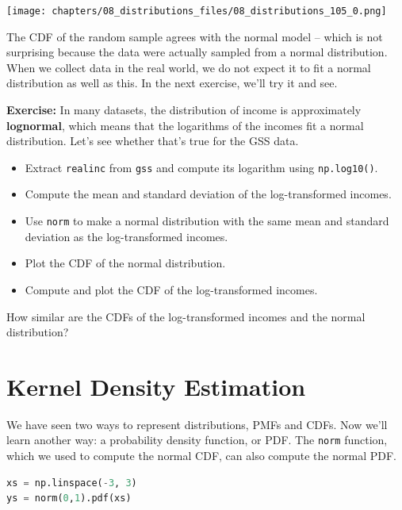 \begin{center}
\texttt{[image: chapters/08\_distributions\_files/08\_distributions\_105\_0.png]}
\end{center}

The CDF of the random sample agrees with the normal model -- which is
not surprising because the data were actually sampled from a normal
distribution. When we collect data in the real world, we do not expect
it to fit a normal distribution as well as this. In the next exercise,
we'll try it and see.

\textbf{Exercise:} In many datasets, the distribution of income is
approximately \textbf{lognormal}, which means that the logarithms of the
incomes fit a normal distribution. Let's see whether that's true for the
GSS data.

\begin{itemize}
\item
  Extract \passthrough{\lstinline!realinc!} from
  \passthrough{\lstinline!gss!} and compute its logarithm using
  \passthrough{\lstinline!np.log10()!}.
\item
  Compute the mean and standard deviation of the log-transformed
  incomes.
\item
  Use \passthrough{\lstinline!norm!} to make a normal distribution with
  the same mean and standard deviation as the log-transformed incomes.
\item
  Plot the CDF of the normal distribution.
\item
  Compute and plot the CDF of the log-transformed incomes.
\end{itemize}

How similar are the CDFs of the log-transformed incomes and the normal
distribution?

\hypertarget{kernel-density-estimation}{%
\section{Kernel Density Estimation}\label{kernel-density-estimation}}

We have seen two ways to represent distributions, PMFs and CDFs. Now
we'll learn another way: a probability density function, or PDF. The
\passthrough{\lstinline!norm!} function, which we used to compute the
normal CDF, can also compute the normal PDF.

\begin{lstlisting}[language=Python,style=source]
xs = np.linspace(-3, 3)
ys = norm(0,1).pdf(xs)
\end{lstlisting}


